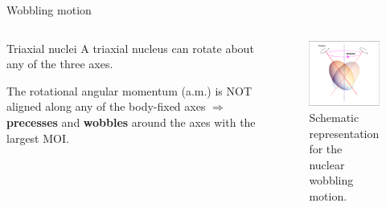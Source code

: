 \documentclass{beamer}
\begin{document}
\begin{frame}{Wobbling motion}
  \begin{columns}
    \begin{column}{0.47\textwidth}
    \begin{block}{Triaxial nuclei}
        A triaxial nucleus can rotate about any of the three axes.

        \vspace{0.3cm}
        The rotational angular momentum (a.m.) is NOT aligned along any of the body-fixed axes $\Longrightarrow$ \textbf{precesses} and \textbf{wobbles} around the axes with the largest MOI. 
    \end{block}
    \end{column}
    \begin{column}{0.53\textwidth}
        \begin{figure}
          \centering
          \includegraphics[scale=0.35]{figures/wobbling_drawing.png}
          \caption{Schematic representation for the nuclear wobbling motion.}
          \label{wobbling_picture}
      \end{figure}
  
    \end{column}
    \end{columns}
\end{frame}
\end{document}
